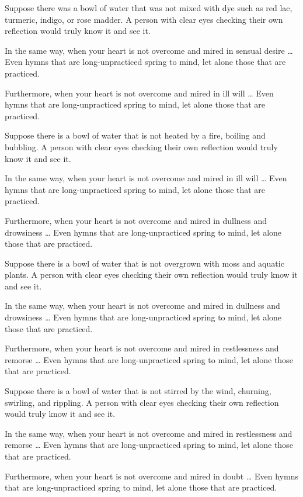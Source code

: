 \documentclass[12pt,openany]{book}%
\begin{document}
Suppose there was a bowl of water that was not mixed with dye such as red lac, turmeric, indigo, or rose madder. A person with clear eyes checking their own reflection would truly know it and see it. 

In the same way, when your heart is not overcome and mired in sensual desire … Even hymns that are long-unpracticed spring to mind, let alone those that are practiced. 

Furthermore, when your heart is not overcome and mired in ill will … Even hymns that are long-unpracticed spring to mind, let alone those that are practiced. 

Suppose there is a bowl of water that is not heated by a fire, boiling and bubbling. A person with clear eyes checking their own reflection would truly know it and see it. 

In the same way, when your heart is not overcome and mired in ill will … Even hymns that are long-unpracticed spring to mind, let alone those that are practiced. 

Furthermore, when your heart is not overcome and mired in dullness and drowsiness … Even hymns that are long-unpracticed spring to mind, let alone those that are practiced. 

Suppose there is a bowl of water that is not overgrown with moss and aquatic plants. A person with clear eyes checking their own reflection would truly know it and see it. 

In the same way, when your heart is not overcome and mired in dullness and drowsiness … Even hymns that are long-unpracticed spring to mind, let alone those that are practiced. 

Furthermore, when your heart is not overcome and mired in restlessness and remorse … Even hymns that are long-unpracticed spring to mind, let alone those that are practiced. 

Suppose there is a bowl of water that is not stirred by the wind, churning, swirling, and rippling. A person with clear eyes checking their own reflection would truly know it and see it. 

In the same way, when your heart is not overcome and mired in restlessness and remorse … Even hymns that are long-unpracticed spring to mind, let alone those that are practiced. 

Furthermore, when your heart is not overcome and mired in doubt … Even hymns that are long-unpracticed spring to mind, let alone those that are practiced. 
\end{document}
